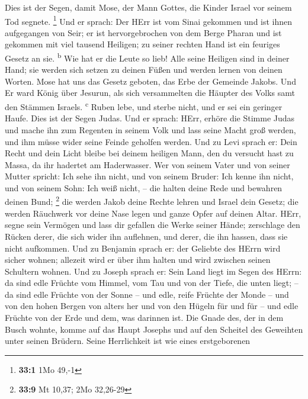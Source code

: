  Dies ist der Segen, damit Mose, der Mann Gottes, die
Kinder Israel vor seinem Tod segnete. \footnote{\textbf{33:1} 1Mo 49,-1}
 Und er sprach: Der HErr ist vom Sinai gekommen und ist
ihnen aufgegangen von Seir; er ist hervorgebrochen von dem Berge Pharan
und ist gekommen mit viel tausend Heiligen; zu seiner rechten Hand ist
ein feuriges Gesetz an sie. \textsuperscript{b}  Wie hat
er die Leute so lieb! Alle seine Heiligen sind in deiner Hand; sie
werden sich setzen zu deinen Füßen und werden lernen von deinen Worten.
 Mose hat uns das Gesetz geboten, das Erbe der Gemeinde
Jakobs.  Und Er ward König über Jesurun, als sich
versammelten die Häupter des Volks samt den Stämmen Israels.
\textsuperscript{c}  Ruben lebe, und sterbe nicht, und er
sei ein geringer Haufe.  Dies ist der Segen Judas. Und er
sprach: HErr, erhöre die Stimme Judas und mache ihn zum Regenten in
seinem Volk und lass seine Macht groß werden, und ihm müsse wider seine
Feinde geholfen werden.  Und zu Levi sprach er: Dein Recht
und dein Licht bleibe bei deinem heiligen Mann, den du versucht hast zu
Massa, da ihr hadertet am Haderwasser.  Wer von seinem
Vater und von seiner Mutter spricht: Ich sehe ihn nicht, und von seinem
Bruder: Ich kenne ihn nicht, und von seinem Sohn: Ich weiß nicht, -- die
halten deine Rede und bewahren deinen Bund; \footnote{\textbf{33:9} Mt
  10,37; 2Mo 32,26-29}  die werden Jakob deine Rechte
lehren und Israel dein Gesetz; die werden Räuchwerk vor deine Nase legen
und ganze Opfer auf deinen Altar.  HErr, segne sein
Vermögen und lass dir gefallen die Werke seiner Hände; zerschlage den
Rücken derer, die sich wider ihn auflehnen, und derer, die ihn hassen,
dass sie nicht aufkommen.  Und zu Benjamin sprach er: der
Geliebte des HErrn wird sicher wohnen; allezeit wird er über ihm halten
und wird zwischen seinen Schultern wohnen.  Und zu Joseph
sprach er: Sein Land liegt im Segen des HErrn: da sind edle Früchte vom
Himmel, vom Tau und von der Tiefe, die unten liegt; -- 
da sind edle Früchte von der Sonne -- und edle, reife Früchte der Monde
--  und von den hohen Bergen von alters her und von den
Hügeln für und für --  und edle Früchte von der Erde und
dem, was darinnen ist. Die Gnade des, der in dem Busch wohnte, komme auf
das Haupt Josephs und auf den Scheitel des Geweihten unter seinen
Brüdern.  Seine Herrlichkeit ist wie eines erstgeborenen
